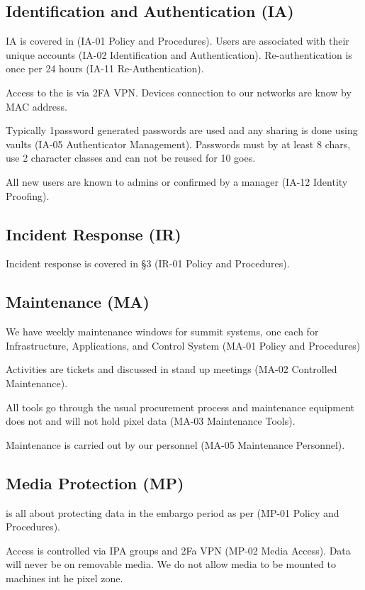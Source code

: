 \subsection{Identification and Authentication (IA)} \label{sec:IA}
IA is covered in  (IA-01  Policy and Procedures).
Users are associated with their unique  accounts (IA-02  Identification and Authentication).
Re-authentication is once per 24 hours (IA-11  Re-Authentication).

Access to the \PZ is via 2FA VPN.
Devices connection to our networks are know by MAC address.

Typically 1password generated passwords are used and any sharing is done using vaults (IA-05  Authenticator Management).
Passwords must by at least 8 chars, use 2 character classes and can not be reused for 10 goes.

All new users are known to admins or confirmed by a manager (IA-12  Identity Proofing).

\subsection{Incident Response (IR)} \label{sec:IR}
Incident response is covered in  \S3 (IR-01  Policy and Procedures).

\subsection{Maintenance (MA)} \label{sec:MA}
We have weekly maintenance windows for summit systems, one each for Infrastructure, Applications, and Control System (MA-01  Policy and Procedures)

Activities are tickets and discussed in stand up meetings (MA-02  Controlled Maintenance).

All tools go through the usual procurement process and maintenance equipment does not and will not hold pixel data (MA-03  Maintenance Tools).

Maintenance is carried out by our personnel (MA-05  Maintenance Personnel).


\subsection{Media Protection (MP)} \label{sec:MP}
\PZ is all about protecting data in the embargo period as per (MP-01  Policy and Procedures).

Access is controlled via IPA groups and 2Fa VPN (MP-02  Media Access).
Data will never be on removable media.
We do not allow media to be mounted to machines int he pixel zone.

